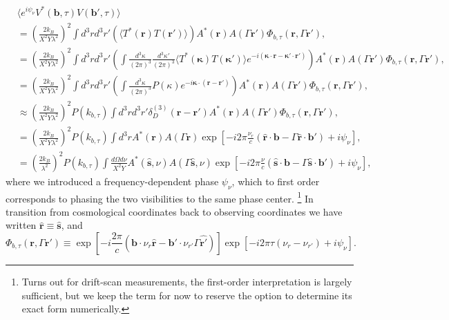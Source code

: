 \documentclass[twocolumn,apj,numberedappendix]{emulateapj}
\renewcommand\[{\begin{equation}}
\renewcommand\]{\end{equation}}
\begin{document}
\begin{widetext}
\begin{equation}
\begin{aligned} & \langle e^{i\psi_{\nu}} V^{*}(\boldsymbol{b},\tau)V(\boldsymbol{b'},\tau)\rangle\\
 & =\left(\frac{2k_{B}}{X^{2}Y\lambda^{2}}\right)^{2}\int d^{3}rd^{3}r'\left(\langle T^{*}(\boldsymbol{r})T(\boldsymbol{r'})\rangle\right)A^{*}(\boldsymbol{r})A(\Gamma \boldsymbol{r'})\Phi_{b,\tau}(\boldsymbol{r},\Gamma \boldsymbol{r'}),\\
 & =\left(\frac{2k_{B}}{X^{2}Y\lambda^{2}}\right)^{2}\int d^{3}rd^{3}r'\left(\int\frac{d^{3}\kappa}{(2\pi)^{3}}\frac{d^{3}\kappa'}{(2\pi)^{3}}\langle T^{*}(\boldsymbol{\kappa})T(\boldsymbol{\kappa'})\rangle e^{-i(\boldsymbol{\kappa}\cdot \boldsymbol{r}-\boldsymbol{\kappa'}\cdot\boldsymbol{r'})}\right)A^{*}(\boldsymbol{r})A(\Gamma \boldsymbol{r'})\Phi_{b,\tau}(\boldsymbol{r},\Gamma \boldsymbol{r'}),\\
 & =\left(\frac{2k_{B}}{X^{2}Y\lambda^{2}}\right)^{2}\int d^{3}rd^{3}r'\left(\int\frac{d^{3}\kappa}{(2\pi)^{3}}P(\kappa)e^{-i\boldsymbol{\kappa}\cdot(\boldsymbol{r}-\boldsymbol{r'})}\right)A^{*}(\boldsymbol{r})A(\Gamma \boldsymbol{r'})\Phi_{b,\tau}(\boldsymbol{r},\Gamma \boldsymbol{r'}),\\
 & \approx\left(\frac{2k_{B}}{X^{2}Y\lambda^{2}}\right)^{2}P(k_{b,\tau})\int d^{3}rd^{3}r'\delta_{D}^{(3)}(\boldsymbol{r}-\boldsymbol{r'})A^{*}(\boldsymbol{r})A(\Gamma \boldsymbol{r'})\Phi_{b,\tau}(\boldsymbol{r},\Gamma \boldsymbol{r'}),\\
 & =\left(\frac{2k_{B}}{X^{2}Y\lambda^{2}}\right)^{2}P(k_{b,\tau})\int d^{3}rA^{*}(\boldsymbol{r})A(\Gamma \boldsymbol{r})\exp\left[-i2\pi\frac{\nu_{r}}{c}\left(\hat{\boldsymbol{r}}\cdot\boldsymbol{b}-\Gamma \hat{\boldsymbol{r}}\cdot\boldsymbol{b'}\right)+i\psi_{\nu}\right],\\
 & =\left(\frac{2k_{B}}{\lambda^{2}}\right)^{2}P(k_{b,\tau})\int\frac{d\Omega d\nu}{X^{2}Y}A^{*}(\hat{\boldsymbol{s}},\nu)A(\Gamma \hat{\boldsymbol{s}},\nu)\exp\left[-i2\pi\frac{\nu}{c}\left(\hat{\boldsymbol{s}}\cdot\boldsymbol{b}-\Gamma\hat{\boldsymbol{s}}\cdot\boldsymbol{b'}\right)+i\psi_{\nu}\right],
\end{aligned}
\label{eq:main}
\end{equation}
where we introduced a frequency-dependent phase $\psi_{\nu}$, which to first order corresponds to phasing the two visibilities to the same phase center. \footnote{Turns out for drift-scan measurements, the first-order interpretation is largely sufficient, but we keep the term for now to reserve the option to determine its exact form numerically.} In transition from cosmological coordinates back to observing coordinates we have written $\hat{\boldsymbol{r}}\equiv\hat{\boldsymbol{s}}$, and 
\begin{equation}
\Phi_{b,\tau}(\boldsymbol{r},\Gamma \boldsymbol{r'})\equiv\exp\left[-i\frac{2\pi}{c}\left(\boldsymbol{b}\cdot\nu_{r}\hat{\boldsymbol{r}}-\boldsymbol{b'}\cdot\nu_{r'}\Gamma\hat{\boldsymbol{r'}}\right)\right]\exp\left[-i2\pi\tau\left(\nu_{r}-\nu_{r'}\right)+i\psi_{\nu}\right].
\end{equation}
\end{widetext}
\end{document}

